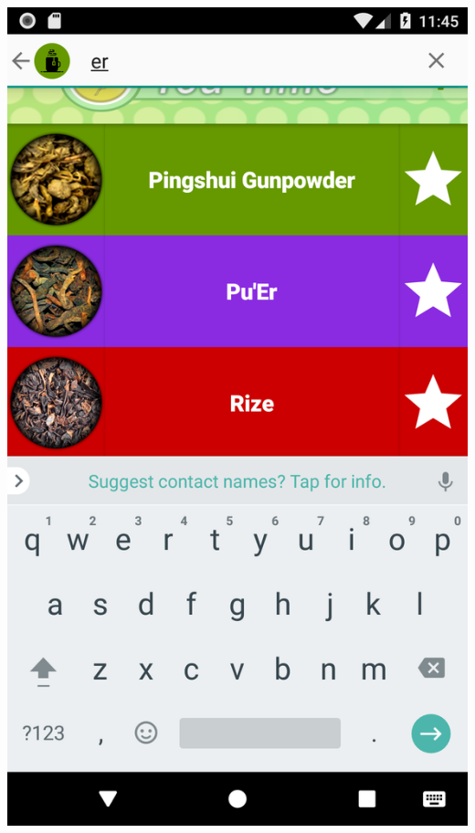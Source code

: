 \documentclass[a4paper,12pt]{article}
\begin{document}
\begin{spacing}{1}
	\includegraphics*[scale=0.1]{Screenshot/07.png}    

\end{spacing}
\end{document}
